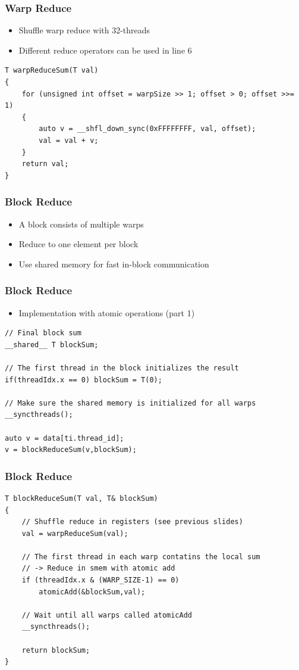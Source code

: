 \documentclass[aspectratio=169]{beamer}
\begin{document}
\begin{frame}[fragile]
\frametitle{Warp Reduce}
\begin{itemize}
	\item Shuffle warp reduce with 32-threads
	\item Different reduce operators can be used in line 6
\end{itemize}

\begin{lstlisting}
T warpReduceSum(T val)
{
	for (unsigned int offset = warpSize >> 1; offset > 0; offset >>= 1)
	{
		auto v = __shfl_down_sync(0xFFFFFFFF, val, offset);
		val = val + v;
	}
	return val;
}
\end{lstlisting}

\end{frame}

\begin{frame}[fragile]
\frametitle{Block Reduce}
\begin{itemize}
	\item A block consists of multiple warps
	\item<2->[$\rightarrow$] Reduce to one element per block
	\item<3->[$\rightarrow$] Use shared memory for fast in-block communication
\end{itemize}


\end{frame}

\begin{frame}[fragile]
\frametitle{Block Reduce}
\begin{itemize}
	\item Implementation with atomic operations (part 1)
\end{itemize}

\begin{lstlisting}
// Final block sum
__shared__ T blockSum;

// The first thread in the block initializes the result
if(threadIdx.x == 0) blockSum = T(0);

// Make sure the shared memory is initialized for all warps
__syncthreads();

auto v = data[ti.thread_id];
v = blockReduceSum(v,blockSum);
\end{lstlisting}
\end{frame}


\begin{frame}[fragile]
\frametitle{Block Reduce}
\begin{lstlisting}
T blockReduceSum(T val, T& blockSum)
{
	// Shuffle reduce in registers (see previous slides)
	val = warpReduceSum(val);

	// The first thread in each warp contatins the local sum
	// -> Reduce in smem with atomic add
	if (threadIdx.x & (WARP_SIZE-1) == 0)
		atomicAdd(&blockSum,val);
		
	// Wait until all warps called atomicAdd
	__syncthreads();

	return blockSum;
}
\end{lstlisting}
\end{frame}
\end{document}
